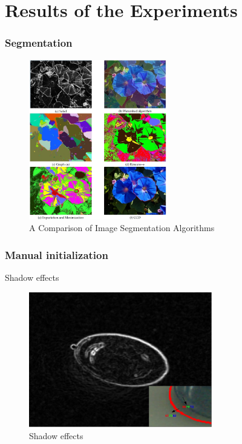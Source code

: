 \documentclass[english,10pt,presentation]{beamer}
\begin{document}
\section{Results of the Experiments}
\label{sec-5}
\begin{frame}
\frametitle{Segmentation}
\label{sec-5_1}

   \begin{figure}[htb]
   \centering
   \includegraphics[width=6cm,angle=0]{./segmentation.jpg}
   \caption{\label{fig:seg}A Comparison of Image Segmentation Algorithms}
   \end{figure}
\end{frame}
\begin{frame}
\frametitle{Manual initialization}
\label{sec-5_2}
\begin{alertblock}{Shadow effects}
\label{sec-5_2_1}

    \begin{figure}[htb]
    \centering
    \includegraphics[width=8cm,angle=0]{./edge.jpg}
    \caption{\label{fig:shadow}Shadow effects}
    \end{figure}
\end{alertblock}
\end{frame}
\end{document}
